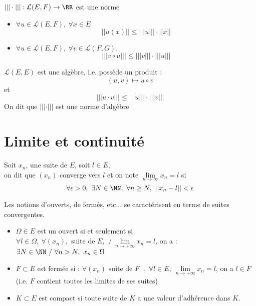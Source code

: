\documentclass[../main.tex]{subfile}
\begin{document}
\begin{prop}
	$|||\cdot||| : \mathcal{L}(E, F) \to \RR$ est une norme
\end{prop}


\begin{propri}
\begin{itemize}
	
	\item $\forall u \in \mathcal{L}(E, F), \ \forall x \in E$\\
	$$||u(x)|| \leq |||u||| \cdot ||x||$$

	\item $\forall u \in \mathcal{L}(E, F), \ \forall v \in \mathcal{L}(F, G)$, \\
	$$|||v \circ u||| \leq |||v||| \cdot |||u|||$$
\end{itemize}
\end{propri}

\begin{rema}
	$\mathcal{L}(E, E)$ est une algèbre, i.e. possède un produit :\\
	$$(u, v) \mapsto u \circ v$$
	et
	$$|||u\cdot v||| \leq |||u||| \cdot |||v|||$$
	On dit que $|||\cdot|||$ est une norme d'algèbre
\end{rema}

\begin{exerc}
\end{exerc}

\section{Limite et continuité}

\begin{defi}
	Soit $x_n$, une suite de $E$, soit $l \in E$, \\
	on dit que $(x_n)$ converge vers $l$ et on note $\lim\limits_{n \to \infty} x_n = l$ si
	$$\forall \epsilon > 0 , \ \exists N \in \NN, \ \forall n \geq N, \ ||x_n - l|| < \epsilon$$
\end{defi}

\begin{rap}
	Les notions d'ouverts, de fermés, etc... se caractérisent en terme de suites convergentes.
\end{rap}

\begin{ex}
\begin{itemize}	
	\item $\Omega \in E$ est un ouvert si et seulement si $\forall l \in \Omega, \ \forall (x_n), \text{ suite de $E$, } \ / \ \lim\limits_{n \to + \infty} x_n = l$, on a : \\
	$\exists N \in \NN \ / \ \forall n > N, \ x_n \in \Omega$
	\item $F \subset E$ est fermée si :
	$\forall (x_n) \text{ suite de $F$ }, \ \forall l \in E, \ \lim\limits_{n \to + \infty} x_n = l$, on a $l \in F$
	(i.e. $F$ contient toutes les limites de ses suites)
	\item $K \subset E$ est compact si toute suite de $K$ a une valeur d'adhérence dans $K$.
\end{itemize}
\end{ex}
\end{document}
